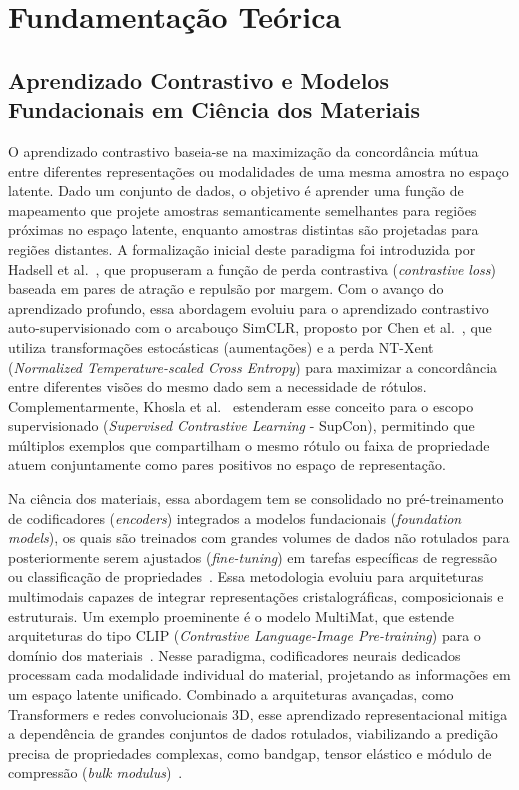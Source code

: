 \chapter{Fundamentação Teórica}

\section{Aprendizado Contrastivo e Modelos Fundacionais em Ciência dos Materiais}
O aprendizado contrastivo baseia-se na maximização da concordância mútua entre diferentes representações ou modalidades de uma mesma amostra no espaço latente. Dado um conjunto de dados, o objetivo é aprender uma função de mapeamento que projete amostras semanticamente semelhantes para regiões próximas no espaço latente, enquanto amostras distintas são projetadas para regiões distantes. A formalização inicial deste paradigma foi introduzida por Hadsell et al.~\cite{hadsell2006dimensionality}, que propuseram a função de perda contrastiva (\textit{contrastive loss}) baseada em pares de atração e repulsão por margem. Com o avanço do aprendizado profundo, essa abordagem evoluiu para o aprendizado contrastivo auto-supervisionado com o arcabouço SimCLR, proposto por Chen et al.~\cite{chen2020simple}, que utiliza transformações estocásticas (aumentações) e a perda NT-Xent (\textit{Normalized Temperature-scaled Cross Entropy}) para maximizar a concordância entre diferentes visões do mesmo dado sem a necessidade de rótulos. Complementarmente, Khosla et al.~\cite{khosla2020supervised} estenderam esse conceito para o escopo supervisionado (\textit{Supervised Contrastive Learning} - SupCon), permitindo que múltiplos exemplos que compartilham o mesmo rótulo ou faixa de propriedade atuem conjuntamente como pares positivos no espaço de representação.

Na ciência dos materiais, essa abordagem tem se consolidado no pré-treinamento de codificadores (\textit{encoders}) integrados a modelos fundacionais (\textit{foundation models}), os quais são treinados com grandes volumes de dados não rotulados para posteriormente serem ajustados (\textit{fine-tuning}) em tarefas específicas de regressão ou classificação de propriedades~\cite{van2026survey}.
Essa metodologia evoluiu para arquiteturas multimodais capazes de integrar representações cristalográficas, composicionais e estruturais. Um exemplo proeminente é o modelo MultiMat, que estende arquiteturas do tipo CLIP (\textit{Contrastive Language-Image Pre-training}) para o domínio dos materiais~\cite{moro2025multimodal}. Nesse paradigma, codificadores neurais dedicados processam cada modalidade individual do material, projetando as informações em um espaço latente unificado. Combinado a arquiteturas avançadas, como Transformers e redes convolucionais 3D, esse aprendizado representacional mitiga a dependência de grandes conjuntos de dados rotulados, viabilizando a predição precisa de propriedades complexas, como bandgap, tensor elástico e módulo de compressão (\textit{bulk modulus})~\cite{moro2025multimodal}.

